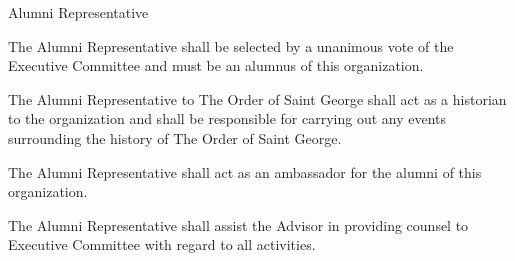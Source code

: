 {
	\begin{article}{Alumni Representative}
		\item The Alumni Representative shall be selected by a unanimous vote of the Executive Committee and must be an alumnus of this organization.
		\item The Alumni Representative to The Order of Saint George shall act as a historian to the organization and shall be responsible for carrying out any events surrounding the history of The Order of Saint George.
		\item The Alumni Representative shall act as an ambassador for the alumni of this organization.
		\item The Alumni Representative shall assist the Advisor in providing counsel to Executive Committee with regard to all activities.
	\end{article}
}